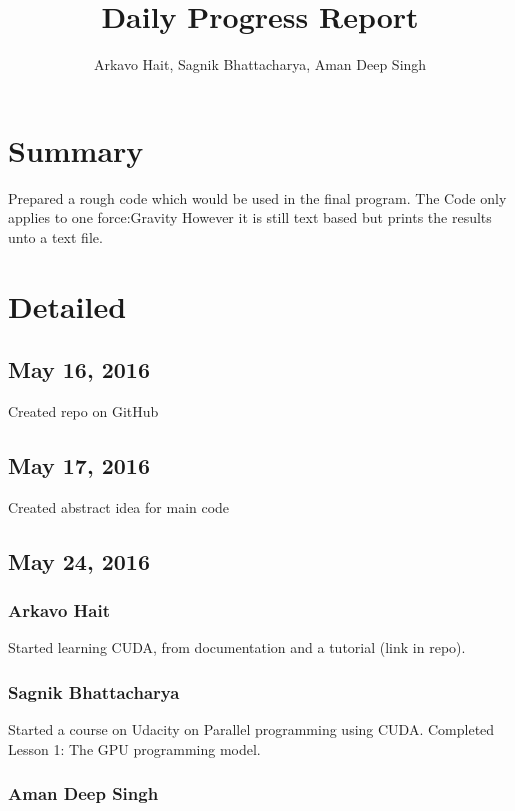 \documentclass{article}
\title{Daily Progress Report}
\author{Arkavo Hait, Sagnik Bhattacharya, Aman Deep Singh}
\begin{document}
\maketitle
\section*{Summary}
Prepared a rough code which would be used in the final program.
The Code only applies to one force:Gravity
However it is still text based but prints the results unto a text file.
\section*{Detailed}
\subsection*{May 16, 2016}
Created repo on GitHub
\subsection*{May 17, 2016}
Created abstract idea for main code
\subsection*{May 24, 2016}
\subsubsection*{Arkavo Hait}
Started learning CUDA, from documentation and a tutorial (link in repo).
\subsubsection*{Sagnik Bhattacharya}
Started a course on Udacity on Parallel programming using CUDA. Completed Lesson 1: The GPU programming model.
\subsubsection*{Aman Deep Singh}


\begin{comment}
\section{What we will do}
Convert the C code to CUDA code to be essential in Parallel computing
Create a GUI to make things visual.
Add other forces and their effects in the future.
We are still workin on the basics of CUDA programming and will covert it to CUDA language soon.
Converting the initial code to a function library to ease up the process and debugging
\end{comment}
\end{document}
